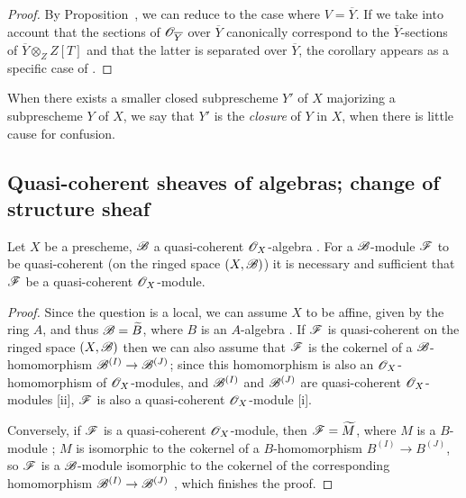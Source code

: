\begin{proof}
\label{proof-1.9.5.11}
By Proposition~, we can reduce to the case where $V=\overline{Y}$.
If we take into account that the sections of $\mathscr{O}_{\overline{Y}}$ over $\overline{Y}$ canonically correspond to the $\overline{Y}$-sections of $\overline{Y}\otimes_Z Z[T]$  and that the latter is separated over $\overline{Y}$, the corollary appears as a specific case of .
\end{proof}

When there exists a smaller closed subprescheme $Y'$ of $X$ majorizing a subprescheme $Y$ of $X$, we say that $Y'$ is the \emph{closure} of $Y$ in $X$, when there is little cause for confusion.

\subsection{Quasi-coherent sheaves of algebras; change of structure sheaf}
\label{subsection:qcoh-algs-and-change-of-str-sheaf}

\begin{prop}[9.6.1]
\label{1.9.6.1}
Let $X$ be a prescheme, $\mathscr{B}$ a quasi-coherent $\mathscr{O}_X$-algebra .
For a $\mathscr{B}$-module $\mathscr{F}$ to be quasi-coherent (on the ringed space $(X,\mathscr{B})$) it is necessary and sufficient that $\mathscr{F}$ be a quasi-coherent $\mathscr{O}_X$-module.
\end{prop}

\begin{proof}
\label{proof-1.9.6.1}
Since the question is a local, we can assume $X$ to be affine, given by the ring $A$, and thus $\mathscr{B}={\widetilde{B}}$, where $B$ is an $A$-algebra .
If $\mathscr{F}$ is quasi-coherent on the ringed space $(X,\mathscr{B})$ then we can also assume that $\mathscr{F}$ is the cokernel of a $\mathscr{B}$-homomorphism $\sh{B}^{(I)}\to\sh{B}^{(J)}$; since this homomorphism is also an $\mathscr{O}_X$-homomorphism of $\mathscr{O}_X$-modules, and $\mathscr{B}^{(I)}$ and $\mathscr{B}^{(J)}$ are quasi-coherent $\mathscr{O}_X$-modules [ii], $\mathscr{F}$ is also a quasi-coherent $\mathscr{O}_X$-module [i].

Conversely, if $\mathscr{F}$ is a quasi-coherent $\mathscr{O}_X$-module, then $\mathscr{F}={\widetilde{M}}$, where $M$ is a $B$-module ; $M$ is isomorphic to the cokernel of a $B$-homomorphism $B^{(I)}\to B^{(J)}$, so $\mathscr{F}$ is a $\mathscr{B}$-module isomorphic to the cokernel of the corresponding homomorphism $\sh{B}^{(I)}\to\sh{B}^{(J)}$ , which finishes the proof.
\end{proof}

